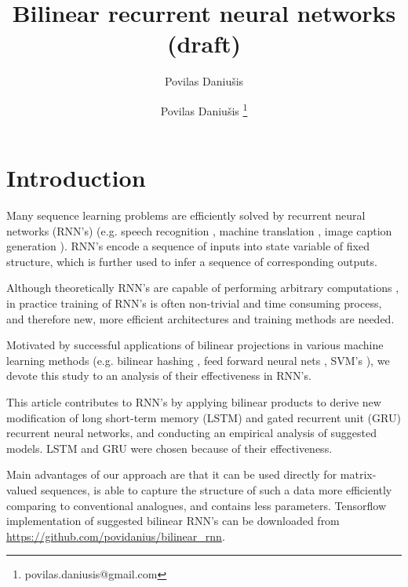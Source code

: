 \documentclass[a4paper,11pt]{article}
\author{Povilas Daniu\v{s}is}
\author[1]{Povilas Daniu\v{s}is \thanks{povilas.daniusis@gmail.com}}
\title{Bilinear recurrent neural networks (draft)}
\begin{document}
\maketitle
\section{Introduction}

Many sequence learning problems are efficiently solved by recurrent neural networks (RNN's) (e.g. speech recognition \cite{Sak}, machine translation \cite{Sutskever}, image caption generation \cite{Vinyals}). RNN's encode a sequence of inputs into state variable of fixed structure, which is further used to infer a sequence of corresponding outputs. 



Although theoretically RNN's are capable of performing arbitrary computations \cite{Siegelmann}, in practice training of RNN's is often non-trivial and time consuming process, and therefore new, more efficient architectures and training methods are needed.





Motivated by successful applications of bilinear projections in
various machine learning methods (e.g. bilinear hashing \cite{Gong}, feed forward neural nets \cite{Daniusis}, SVM's \cite{Cai}), we devote this study to an analysis of their effectiveness in RNN's.


This article contributes to RNN's by applying bilinear products to derive new modification of long short-term memory (LSTM) \cite{Hochreiter} and gated recurrent unit (GRU) \cite{Chung} recurrent neural networks, and conducting an empirical analysis of suggested models. LSTM and GRU were chosen because of their effectiveness.

Main advantages of our approach are that it can be used directly for matrix-valued sequences, is able to capture the structure of such a data more efficiently comparing to conventional analogues, and contains less parameters. Tensorflow \cite{Tensorflow} implementation of suggested bilinear RNN's can be downloaded from \url{https://github.com/povidanius/bilinear_rnn}.
\end{document}

